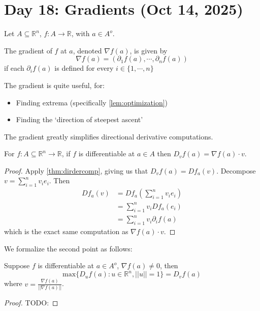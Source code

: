 \section{Day 18: Gradients (Oct 14, 2025)}

Let $A \subseteq \mathbb{R}^n$, $f : A \to \mathbb{R}$, with $a \in A^o$.
\begin{definition}[Gradient]
    The gradient of $f$ at $a$, denoted $\nabla f(a)$, is given by
    \[
    \nabla f(a) = (\partial_1 f(a), \cdots, \partial_n f(a))
    \]
    if each $\partial_if(a)$ is defined for every $i \in \{ 1, \cdots, n \}$
\end{definition}

\noindent  The gradient is quite useful, for:
\begin{itemize}
\item Finding extrema (specifically \ref{lem:optimization})
\item Finding the `direction of steepest ascent'
\end{itemize}

\noindent The gradient greatly simplifies directional derivative computations.

\begin{simplethm}
    For $f : A \subseteq \mathbb{R}^n \to \mathbb{R}$, if $f$ is differentiable at $a \in A$ then $D_vf(a) = \nabla f(a) \cdot v$.
\end{simplethm}
\begin{proof}
    Apply \ref{thm:dirdercomp}, giving us that $D_vf(a) = Df_a(v)$. Decompose $v = \sum_{i=1}^{n} v_ie_i$. Then
    \begin{align*}
        Df_a(v) &= Df_a(\sum_{i=1}^{n} v_ie_i) \\
        &= \sum_{i=1}^{n} v_i Df_a(e_i) \\
        &= \sum_{i=1}^{n} v_i \partial_i f(a)
    \end{align*}
    which is the exact same computation as $\nabla f(a) \cdot v$.
\end{proof}

\noindent We formalize the second point as follows:
\begin{simplethm}
    Suppose $f$ is differentiable at $a \in A^o$, $\nabla f(a) \ne 0$, then
    \[
    \text{max}\{ D_u f(a) : u \in \mathbb{R}^n, ||u|| = 1 \} = D_v f(a)
    \]
    where $v = \frac{\nabla f(a)}{||\nabla f(a)||}$.
\end{simplethm}

\begin{proof}
    TODO:
\end{proof}

